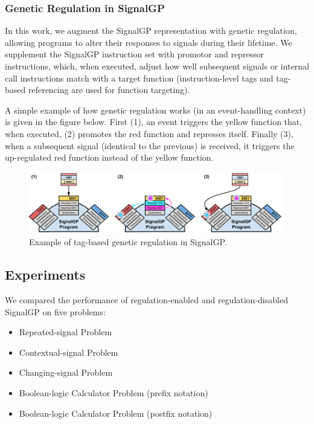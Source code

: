 \documentclass[
]{book}
\providecommand{\tightlist}{%
  \setlength{\itemsep}{0pt}\setlength{\parskip}{0pt}}
\begin{document}
\hypertarget{genetic-regulation-in-signalgp}{%
\subsubsection{Genetic Regulation in SignalGP}\label{genetic-regulation-in-signalgp}}

In this work, we augment the SignalGP representation with genetic regulation, allowing programs to alter their responses to signals during their lifetime.
We supplement the SignalGP instruction set with promotor and repressor instructions, which, when executed, adjust how well subsequent signals or internal call instructions match with a target function (instruction-level tags and tag-based referencing are used for function targeting).

A simple example of how genetic regulation works (in an event-handling context) is given in the figure below. First (1), an event triggers the yellow function that, when executed, (2) promotes the red function and represses itself. Finally (3), when a subsequent signal (identical to the previous) is received, it triggers the up-regulated red function instead of the yellow function.

\begin{figure}
\centering
\includegraphics{./media/regulation-example-cartoon.png}
\caption{Example of tag-based genetic regulation in SignalGP.}
\end{figure}

\hypertarget{experiments}{%
\subsection{Experiments}\label{experiments}}

We compared the performance of regulation-enabled and regulation-disabled SignalGP on five problems:

\begin{itemize}
\tightlist
\item
  Repeated-signal Problem
\item
  Contextual-signal Problem
\item
  Changing-signal Problem
\item
  Boolean-logic Calculator Problem (prefix notation)
\item
  Boolean-logic Calculator Problem (postfix notation)
\end{itemize}
\end{document}
